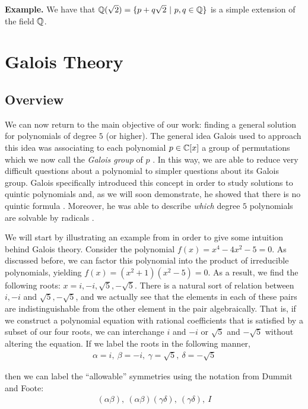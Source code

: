 \documentclass[11pt, a4paper, oneside]{article}
\theoremstyle{plain}
\theoremstyle{plain}
\theoremstyle{plain}
\theoremstyle{plain}
\theoremstyle{definition}
\theoremstyle{example}
\begin{document}
{\textbf{Example.} We have that $\mathbb{Q}(\sqrt{2}) = \{p + q\sqrt{2} \ | \ p, q \in \mathbb{Q}\}$ is a simple extension of the field $\mathbb{Q}$.


\section{Galois Theory}

\subsection{Overview}

We can now return to the main objective of our work: finding a general solution for polynomials of degree $5$ (or higher). The general idea Galois used to approach this idea was associating to each polynomial $p \in \mathbb{C}[x]$ a group of permutations which we now call the \textit{Galois group} of $p$ \cite[\S 8, p. 107]{stewart}. In this way, we are able to reduce very difficult questions about a polynomial to simpler questions about its Galois group. Galois specifically introduced this concept in order to study solutions to quintic polynomials and, as we will soon demonstrate, he showed that there is no quintic formula \cite{galoiswiki}. Moreover, he was able to describe \textit{which} degree $5$ polynomials are solvable by radicals \cite{galoiswiki}.

We will start by illustrating an example from \cite[\S 8.2]{stewart} in order to give some intuition behind Galois theory. Consider the polynomial $f(x) = x^4 - 4x^2 - 5 = 0$. As discussed before, we can factor this polynomial into the product of irreducible polynomials, yielding $f(x) = (x^2+1)(x^2-5) = 0$. As a result, we find the following roots: $x = i, -i, \sqrt{5}, -\sqrt{5}$. There is a natural sort of relation between $i, -i$ and $\sqrt{5}, -\sqrt{5}$, and we actually see that the elements in each of these pairs are indistinguishable from the other element in the pair algebraically. That is, if we construct a polynomial equation with rational coefficients that is satisfied by a subset of our four roots, we can interchange $i$ and $-i$ or $\sqrt{5}$ and $-\sqrt{5}$ without altering the equation. If we label the roots in the following manner,
\begin{align*}
\alpha = i, \ \beta = -i, \ \gamma = \sqrt{5}, \ \delta = -\sqrt{5}
\end{align*}

then we can label the ``allowable'' symmetries using the notation from Dummit and Foote:
\begin{align*}
(\alpha \beta), \ (\alpha \beta)(\gamma \delta), \ (\gamma \delta), \ I
\end{align*}

}
\end{document}

